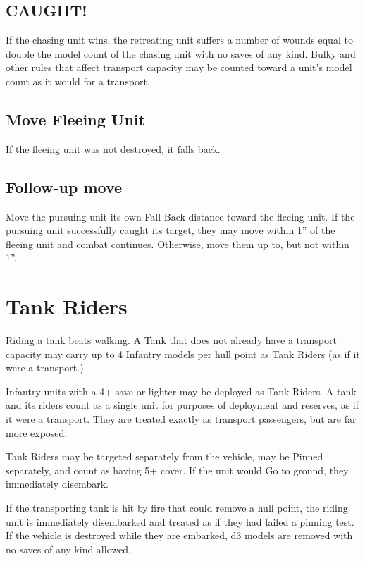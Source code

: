 \documentclass[letterpaper,twocolumn,oneside,titlepage]{book}
\begin{document}
\subsection{\texorpdfstring{\textbf{CAUGHT!}}{CAUGHT!}}\label{caught}

If the chasing unit wins, the retreating unit suffers a number of wounds
equal to double the model count of the chasing unit with no saves of any
kind. Bulky and other rules that affect transport capacity may be
counted toward a unit's model count as it would for a transport.

\subsection{\texorpdfstring{\textbf{Move Fleeing
Unit}}{Move Fleeing Unit}}\label{move-fleeing-unit}

If the fleeing unit was not destroyed, it falls back.

\subsection{\texorpdfstring{\textbf{Follow-up
move}}{Follow-up move}}\label{follow-up-move}

Move the pursuing unit its own Fall Back distance toward the fleeing
unit. If the pursuing unit successfully caught its target, they may move
within 1'' of the fleeing unit and combat continues. Otherwise, move
them up to, but not within 1''.

\section{\texorpdfstring{\textbf{Tank
Riders}}{Tank Riders}}\label{tank-riders}

Riding a tank beats walking. A Tank that does not already have a
transport capacity may carry up to 4 Infantry models per hull point as
Tank Riders (as if it were a transport.)

Infantry units with a 4+ save or lighter may be deployed as Tank Riders.
A tank and its riders count as a single unit for purposes of deployment
and reserves, as if it were a transport. They are treated exactly as
transport passengers, but are far more exposed.

Tank Riders may be targeted separately from the vehicle, may be Pinned
separately, and count as having 5+ cover. If the unit would Go to
ground, they immediately disembark.

If the transporting tank is hit by fire that could remove a hull point,
the riding unit is immediately disembarked and treated as if they had
failed a pinning test. If the vehicle is destroyed while they are
embarked, d3 models are removed with no saves of any kind allowed.
\end{document}
